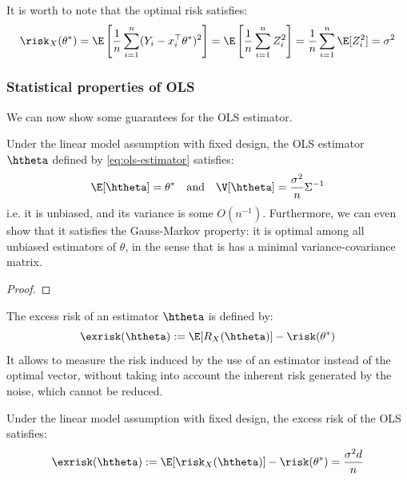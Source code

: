 \documentclass{../cs-classes/cs-classes}
\begin{document}
\begin{remark}
    It is worth to note that the optimal risk satisfies:
    \begin{equation*}
        \risk_X(\theta^*) = \E\left[\frac{1}{n}\sum_{i=1}^n(Y_i-x_i^\top\theta^*)^2\right] = \E\left[\frac{1}{n}\sum_{i=1}^nZ_i^2\right] = \frac{1}{n}\sum_{i=1}^n\E[Z_i^2]=\sigma^2
    \end{equation*}
\end{remark}

\subsubsection{Statistical properties of OLS}
We can now show some guarantees for the OLS estimator.

\begin{property}
    Under the linear model assumption with fixed design, the OLS estimator $\htheta$ defined by \eqref{eq:ols-estimator} satisfies:
    \begin{equation*}
        \E[\htheta] = \theta^* \quad \textnormal{and} \quad \V[\htheta] = \frac{\sigma^2}{n}\Sigma^{-1}
    \end{equation*}
    i.e. it is unbiased, and its variance is some $O(n^{-1})$. Furthermore, we can even show that it satisfies the Gauss-Markov property: it is optimal among all unbiased estimators of $\theta$, in the sense that is has a minimal variance-covariance matrix.
\end{property}

\begin{proof}
\end{proof}

\begin{definition}
    The excess risk of an estimator $\htheta$ is defined by:
    \begin{equation}
        \label{eq:excess-risk}
        \exrisk(\htheta) := \E[R_X(\htheta)]-\risk(\theta^*)
    \end{equation}
    It allows to measure the risk induced by the use of an estimator instead of the optimal vector, without taking into account the inherent risk generated by the noise, which cannot be reduced.
\end{definition}

\begin{corollary}
    Under the linear model assumption with fixed design, the excess risk of the OLS satisfies:
    \begin{equation*}
        \exrisk(\htheta) := \E[\risk_X(\htheta)]-\risk(\theta^*)=\frac{\sigma^2d}{n}
    \end{equation*}
\end{corollary}
\end{document}
